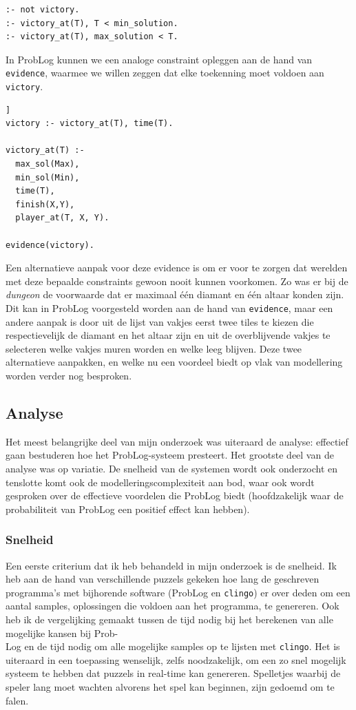 \documentclass{article}
\begin{document}
\begin{lstlisting}[language=Prolog-pretty]
:- not victory.
:- victory_at(T), T < min_solution.
:- victory_at(T), max_solution < T.
\end{lstlisting}

In ProbLog kunnen we een analoge constraint opleggen aan de hand van \texttt{evidence}, waarmee we willen zeggen dat elke toekenning moet voldoen aan \texttt{victory}.
\begin{lstlisting}[language=Prolog-pretty,xleftmargin=0\textwidth,xrightmargin=.0\textwidth]]
victory :- victory_at(T), time(T).

victory_at(T) :-
  max_sol(Max),
  min_sol(Min),
  time(T),
  finish(X,Y),
  player_at(T, X, Y).
  
evidence(victory).
\end{lstlisting}

Een alternatieve aanpak voor deze evidence is om er voor te zorgen dat werelden met deze bepaalde constraints gewoon nooit kunnen voorkomen. Zo was er bij de \textit{dungeon} de voorwaarde dat er maximaal \'e\'en diamant en \'e\'en altaar konden zijn. Dit kan in ProbLog voorgesteld worden aan de hand van \texttt{evidence}, maar een andere aanpak is door uit de lijst van vakjes eerst twee tiles te kiezen die respectievelijk de diamant en het altaar zijn en uit de overblijvende vakjes te selecteren welke vakjes muren worden en welke leeg blijven. Deze twee alternatieve aanpakken, en welke nu een voordeel biedt op vlak van modellering worden verder nog besproken.
	
	\subsection{Analyse}
Het meest belangrijke deel van mijn onderzoek was uiteraard de analyse: effectief gaan bestuderen hoe het ProbLog-systeem presteert. Het grootste deel van de analyse was op variatie. De snelheid van de systemen wordt ook onderzocht en tenslotte komt ook de modelleringscomplexiteit aan bod, waar ook wordt gesproken over de effectieve voordelen die ProbLog biedt (hoofdzakelijk waar de probabiliteit van ProbLog een positief effect kan hebben).

\subsubsection*{Snelheid}
Een eerste criterium dat ik heb behandeld in mijn onderzoek is de snelheid. Ik heb aan de hand van verschillende puzzels gekeken hoe lang de geschreven programma's met bijhorende software (ProbLog en \texttt{clingo}) er over deden om een aantal samples, oplossingen die voldoen aan het programma, te genereren. Ook heb ik de vergelijking gemaakt tussen de tijd nodig bij het berekenen van alle mogelijke kansen bij Prob-\\Log en de tijd nodig om alle mogelijke samples op te lijsten met \texttt{clingo}. Het is uiteraard in een toepassing wenselijk, zelfs noodzakelijk, om een zo snel mogelijk systeem te hebben dat puzzels in real-time kan genereren. Spelletjes waarbij de speler lang moet wachten alvorens het spel kan beginnen, zijn gedoemd om te falen.
\end{document}
